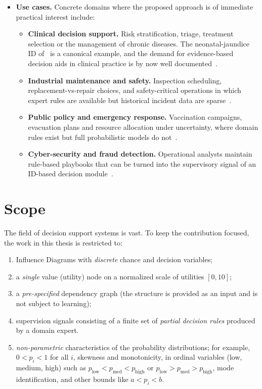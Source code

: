 \begin{itemize}
\item \textbf{Use cases.} Concrete domains where the proposed approach
is of immediate practical interest include:
\begin{itemize}
    \item \textbf{Clinical decision support.}
          Risk stratification, triage, treatment selection or the
          management of chronic diseases. The neonatal-jaundice ID
          of~\cite{gomez2007jaundice} is a canonical example, and
          the demand for evidence-based decision aids in clinical
          practice is by now well documented~\cite{dowding2004evidence}.
    \item \textbf{Industrial maintenance and safety.}
          Inspection scheduling, replacement-vs-repair choices, and
          safety-critical operations in which expert rules are
          available but historical incident data are
          sparse~\cite{machado2016maintenance}.
    \item \textbf{Public policy and emergency response.}
          Vaccination campaigns, evacuation plans and resource
          allocation under uncertainty, where domain rules exist but
          full probabilistic models do
          not~\cite{kailiponi2010evacuation}.
    \item \textbf{Cyber-security and fraud detection.}
          Operational analysts maintain rule-based playbooks that can
          be turned into the supervisory signal of an ID-based
          decision module~\cite{chockalingam2023cyber}.
\end{itemize}\end{itemize}

\section{Scope}

The field of decision support systems is vast. To keep the
contribution focused, the work in this thesis is restricted to:
\begin{enumerate}
    \item Influence Diagrams with \emph{discrete} chance and decision
          variables;
    \item a \emph{single} value (utility) node on a normalized scale of utilities $[0,10]$;
    \item a \emph{pre-specified} dependency graph (the structure is
          provided as an input and is not subject to learning);
    \item supervision signals consisting of a finite set of
          \emph{partial decision rules} produced by a domain expert.
    \item \emph{non-parametric} characteristics of the probability distributions; 
          for example, $0 < p_i < 1$ for all $i$, skewness and monotonicity, in 
          ordinal variables (low, medium, high) such as $p_{\text{low}} < p_{\text{med}} < p_{\text{high}}$ 
          or $p_{\text{low}} > p_{\text{med}} > p_{\text{high}}$, mode identification, 
          and other bounds like $a < p_i < b$.
\end{enumerate}

